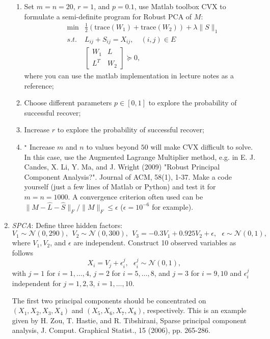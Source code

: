 \documentclass[11pt]{article}
\def\NN{{\mathcal N}}
\def\tr{{\mathrm{trace}}}
\begin{document}
\begin{enumerate}
\begin{enumerate}
\item Set $m=n=20$, $r=1$, and $p=0.1$, use Matlab toolbox CVX to formulate a semi-definite program for Robust PCA of $M$:
\begin{eqnarray} \label{eq:RPCA_SDP}
& \min & \frac{1}{2} (\tr(W_1)+\tr(W_2)) + \lambda \|S\|_1 \\
& s.t. & L_{ij} +S_{ij} = X_{ij}, \quad (i,j)\in E  \nonumber \\
& & \displaystyle \left[ \begin{array}{cc} 
W_1 & L \\
L^T & W_2
\end{array}
\right] \succeq 0, \nonumber
\end{eqnarray}
where you can use the matlab implementation in lecture notes as a reference;
\item Choose different parameters $p\in [0,1]$ to explore the probability of successful recover;
\item Increase $r$ to explore the probability of successful recover;
\item $^\star$ Increase $m$ and $n$ to values beyond $50$ will make CVX difficult to solve. In this case, use the Augmented Lagrange Multiplier method, e.g. in E. J. Candes, X. Li, Y. Ma, and J. Wright (2009) "Robust Principal Component Analysis?". Journal of ACM, 58(1), 1-37. Make a code yourself (just a few lines of Matlab or Python) and test it for $m=n=1000$. A convergence criterion often used can be $\|M-\hat{L} - \hat{S} \|_F / \|M\|_F \leq \epsilon$ ($\epsilon=10^{-6}$ for example).  
\end{enumerate}


\item {\em SPCA}: Define three hidden factors: 
\[ V_1 \sim \NN(0,290), \ \ V_2 \sim \NN(0,300), \ \ V_3 = -0.3 V_1 + 0.925  V_2 + \epsilon, \ \ \ \epsilon \sim \NN(0,1), \]
where $V_1,V_2$, and $\epsilon$ are independent. Construct 10 observed variables as follows
\[ X_i = V_j + \epsilon^j_i, \ \ \ \epsilon^j_i \sim \NN(0,1), \] 
with $j=1$ for $i=1,\ldots,4$, $j=2$ for $i=5,\ldots,8$, and $j=3$ for $i=9,10$ and $\epsilon^j_i$ independent for $j=1,2,3$, $i=1,\ldots,10$. 

The first two principal components should be concentrated on $(X_1,X_2,X_3,X_4)$ and $(X_5,X_6,X_7,X_8)$, respectively. This is an example given
by H. Zou, T. Hastie, and R. Tibshirani, Sparse principal component analysis, J. Comput. Graphical Statist., 15 (2006), pp. 265-286.


\end{enumerate}
\end{document}
